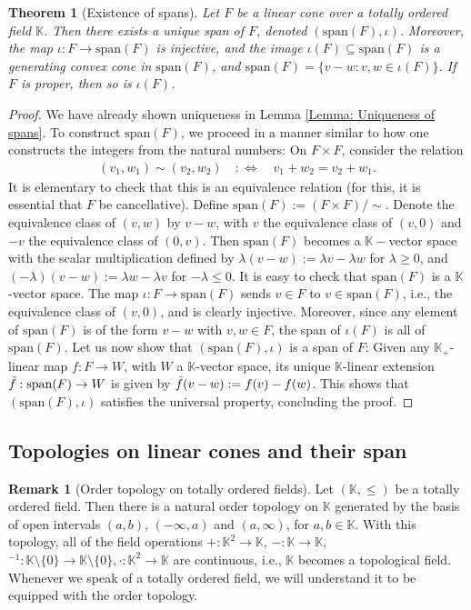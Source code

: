 \documentclass[a4paper,11pt]{article}
\numberwithin{equation}{section}
\theoremstyle{definition}
\newtheorem{Remark}[Definition]{Remark}
\theoremstyle{plain}
\newtheorem{Theorem}[Definition]{Theorem}
\newcommand{\spn}{\mathrm{span}}
\begin{document}
\begin{Theorem}[Existence of spans]\label{Theorem: existenceofspans}
Let $F$ be a linear cone over a totally ordered field $\mathbb{K}$. Then there exists a unique span of $F$, denoted $(\spn(F),\iota)$. Moreover, the map $\iota: F \to \spn(F)$ is injective, and the image $\iota(F) \subseteq \spn(F)$ is a generating convex cone in $\spn(F)$, and $\spn(F) = \{v - w: v,w \in \iota(F)\}$. If $F$ is proper, then so is $\iota(F)$.
\end{Theorem}
\begin{proof}
    We have already shown uniqueness in Lemma \ref{Lemma: Uniqueness of spans}. To construct $\spn(F)$, we proceed in a manner similar to how one constructs the integers from the natural numbers: On $F \times F$, consider the relation
    \begin{align}
        (v_1,w_1) \sim (v_2,w_2) \quad :\Leftrightarrow \quad v_1 + w_2 = v_2 + w_1.
    \end{align}
    It is elementary to check that this is an equivalence relation (for this, it is essential that $F$ be cancellative). Define $\spn(F):=(F \times F) / \sim$. Denote the equivalence class of $(v,w)$ by $v-w$, with $v$ the equivalence class of $(v,0)$ and $-v$ the equivalence class of $(0,v)$. Then $\spn(F)$ becomes a $\mathbb{K}-$vector space with the scalar multiplication defined by $\lambda (v - w):= \lambda v - \lambda w$ for $\lambda \geq 0$, and $(-\lambda)(v - w):= \lambda w - \lambda v$ for $-\lambda \leq 0$. It is easy to check that $\spn(F)$ is a $\mathbb{K}$-vector space. The map $\iota:F \to \spn(F)$ sends $v \in F$ to $v \in \spn(F)$, i.e., the equivalence class of $(v,0)$, and is clearly injective. Moreover, since any element of $\spn(F)$ is of the form $v-w$ with $v,w \in F$, the span of $\iota(F)$ is all of $\spn(F)$. Let us now show that $(\spn(F),\iota)$ is a span of $F$: Given any $\mathbb{K}_+$-linear map $f:F \to W$, with $W$ a $\mathbb{K}$-vector space, its unique $\mathbb{K}$-linear extension $\Tilde{f}: \spn(F) \to W$ is given by $\Tilde{f}(v - w):= f(v) - f(w)$. This shows that $(\spn(F),\iota)$ satisfies the universal property, concluding the proof.
\end{proof}

\subsection{Topologies on linear cones and their span}

\begin{Remark}[Order topology on totally ordered fields]
Let $(\mathbb{K},\leq)$ be a totally ordered field. Then there is a natural order topology on $\mathbb{K}$ generated by the basis of open intervals $(a,b)$, $(-\infty,a)$ and $(a,\infty)$, for $a,b \in \mathbb{K}$. With this topology, all of the field operations $+:\mathbb{K}^2 \to \mathbb{K}$, $-:\mathbb{K} \to \mathbb{K}$, $^{-1}:\mathbb{K} \setminus \{0\} \to \mathbb{K} \setminus \{0\}, \cdot:\mathbb{K}^2 \to \mathbb{K}$ are continuous, i.e., $\mathbb{K}$ becomes a topological field. Whenever we speak of a totally ordered field, we will understand it to be equipped with the order topology.
\end{Remark}
\end{document}
